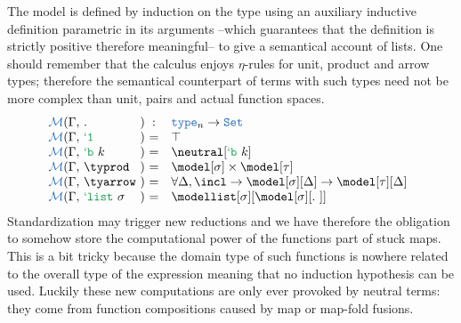 \begin{definition} The model is defined by induction on the type using an auxiliary
inductive definition parametric in its arguments --which guarantees that the
definition is strictly positive therefore meaningful-- to give a semantical account
of lists. One should remember that the calculus enjoys $\eta$-rules for unit,
product and arrow types; therefore the semantical counterpart of terms with such
types need not be more complex than unit, pairs and actual function spaces.
$$\begin{array}{@{\NBE(\Gamma,~}l@{~)~}cl}
  . & : & \type \rightarrow \set \\
  \tyunit  & = & \top\\
  \tybase  & = & \neutral[\tybase]\\
  \typrod  & = & \model[\sigma] \times \model[\tau]\\
  \tyarrow & = & \forall \Delta, \incl \rightarrow \model[\sigma][\Delta] \rightarrow \model[\tau][\Delta]\\
  \tylist  & = & \modellist[\sigma][\modellistfun]\\
\end{array}$$
Standardization may trigger new reductions and we have therefore the obligation
to somehow store the computational power of the functions part of stuck maps. This
is a bit tricky because the domain type of such functions is nowhere related to
the overall type of the expression meaning that no induction hypothesis can be used.
Luckily these new computations are only ever provoked by neutral terms: they come
from function compositions caused by map or map-fold fusions.
\end{definition}

